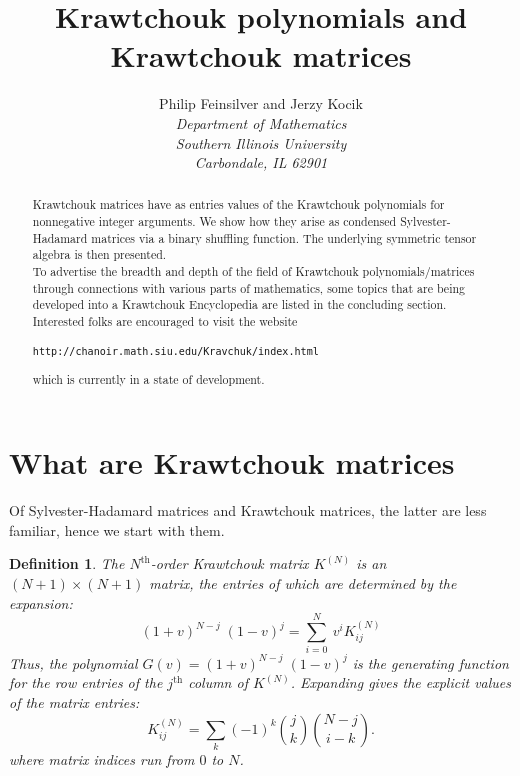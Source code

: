 \documentclass[12pt]{article}
\title{Krawtchouk polynomials and Krawtchouk matrices}
\author{Philip Feinsilver and Jerzy Kocik\\         %
\em Department of Mathematics\\
\em Southern Illinois University\\
\em Carbondale, IL 62901}
\newtheorem{definition}[theorem]{Definition}
\def\KM{K}
\def\FFF#1#2{K^{(#1)}_{#2}}
\numberwithin{equation}{section}
\begin{document}
\maketitle




\begin{abstract}
Krawtchouk matrices have as entries values of the Krawtchouk polynomials for nonnegative integer arguments.
We show how they arise as condensed Sylvester-Hadamard matrices via a binary shuffling function.
The underlying symmetric tensor algebra is then presented.\\

To advertise the breadth and depth of the field of Krawtchouk polynomials/matrices
through connections with various parts of mathematics, 
some topics  that are being developed into a Krawtchouk Encyclopedia are listed in the concluding section.
Interested folks are encouraged to visit the website 

\begin{center}
        {\tt http://chanoir.math.siu.edu/Kravchuk/index.html}\\
\end{center}
\noindent
which is currently in a state of development. 
\end{abstract}




\section{What are Krawtchouk matrices}
\label{sec:intro}

Of Sylvester-Hadamard matrices and Krawtchouk matrices,
the latter are less familiar, hence we start with them.

\begin{definition}\rm
The {\sl $N^{\mathrm{th}}$-order Krawtchouk  matrix $\FFF N{}$} is an
$(N+1)\times(N+1)$ matrix,
the entries of which are determined by the expansion:
\begin{equation}\label{eq:genkraw}
    (1+v)^{N-j} \; (1-v)^j = \sum_{i=0}^{N} \ v^i \KM^{(N)}_{ij}
\end{equation}
Thus, the polynomial 
$
              G(v)= (1+v)^{N-j}\; (1-v)^j
$
is the {\it generating function} for the 
row entries of the $j^{\mathrm{th}}$ column of $\KM^{(N)}$.
Expanding gives the explicit values of the matrix entries:
$$
\KM^{(N)}_{ij}= \sum_{k} (-1)^k {j \choose k}
      {N-j \choose i-k} .
$$ 
where  matrix indices run from $0$ to $N$.
\end{definition}
\end{document}
